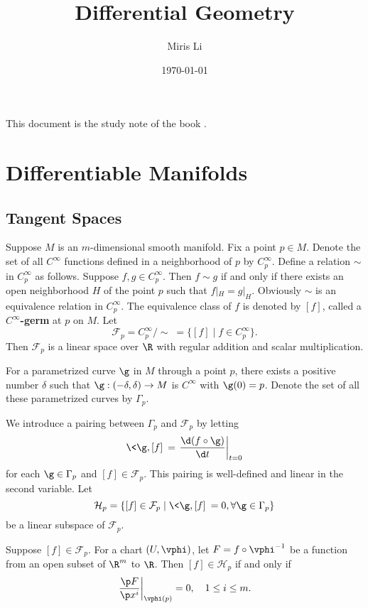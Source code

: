 \documentclass[11pt]{article}
\title{Differential Geometry}
\author{Miris Li}
\date{\today}
\begin{document}
\maketitle

This document is the study note of the book \cite{Chern}.

\section{Differentiable Manifolds}

\subsection{Tangent Spaces}

Suppose $M$ is an $m$-dimensional smooth manifold. Fix a point $p \in M$. Denote the set of all $C^\infty$ functions defined in a neighborhood of $p$ by $C^\infty_p$. Define a relation $\sim$ in $C^\infty_p$ as follows. Suppose $f, g \in C^\infty_p$. Then $f \sim g$ if and only if there exists an open neighborhood $H$ of the point $p$ such that $f|_H = g|_H$. Obviously $\sim$ is an equivalence relation in $C^\infty_p$. The equivalence class of $f$ is denoted by $[f]$, called a \textbf{$C^\infty$-germ} at $p$ on $M$. Let $$\mathcal{F}_p = C^\infty_p / \sim \;= \{[f] \mid f \in C^\infty_p\}.$$ Then $\mathcal{F}_p$ is a linear space over $\R$ with regular addition and scalar multiplication. 

For a parametrized curve $\g$ in $M$ through a point $p$, there exists a positive number $\delta$ such that $\g : (-\delta, \delta) \rightarrow M$ is $C^\infty$ with $\g(0) = p$. Denote the set of all these parametrized curves by $\Gamma_p$. 

We introduce a pairing between $\Gamma_p$ and $\mathcal{F}_p$ by letting $$\<\g, [f]\> = \left.\frac{\d(f \circ \g)}{\d t}\right|_{t=0}$$ for each $\g \in \Gamma_p$ and $[f] \in \mathcal{F}_p$. This pairing is well-defined and linear in the second variable. Let $$\mathcal{H}_p = \{[f] \in \mathcal{F}_p \mid \<\g, [f]\> = 0, \forall \g \in \Gamma_p\}$$ be a linear subspace of $\mathcal{F}_p$. 

\begin{theorem}
    Suppose $[f] \in \mathcal{F}_p$. For a chart $(U, \vphi)$, let $F = f \circ \vphi^{-1}$ be a function from an open subset of $\R^m$ to $\R$. Then $[f] \in \mathcal{H}_p$ if and only if $$\left.\frac{\p F}{\p x^i}\right|_{\vphi(p)} = 0, \quad 1 \le i \le m.$$
\end{theorem}
\end{document}
